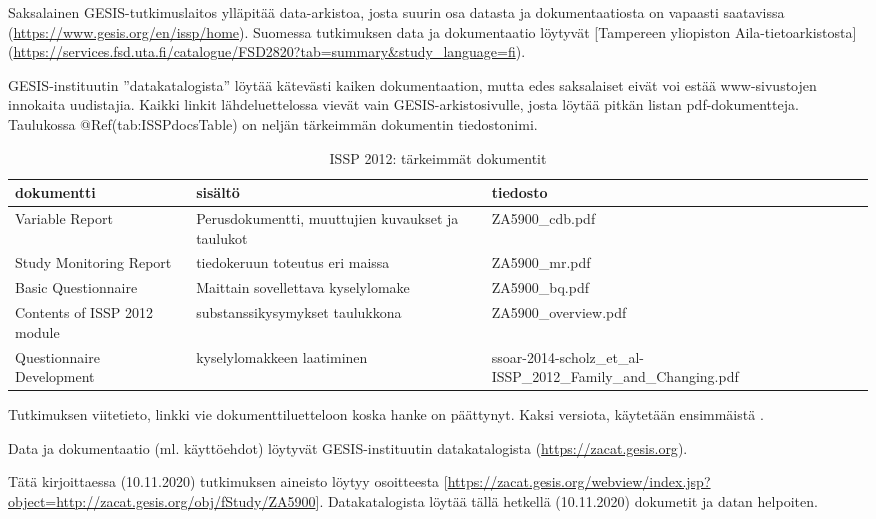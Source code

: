 \documentclass[
  finnish,
]{book}
\begin{document}
Saksalainen GESIS-tutkimuslaitos ylläpitää data-arkistoa, josta suurin osa
datasta ja dokumentaatiosta on vapaasti saatavissa
(\url{https://www.gesis.org/en/issp/home}). Suomessa tutkimuksen data ja dokumentaatio
löytyvät {[}Tampereen yliopiston Aila-tietoarkistosta{]}
(\url{https://services.fsd.uta.fi/catalogue/FSD2820?tab=summary\&study_language=fi}).

GESIS-instituutin ''datakatalogista'' löytää kätevästi kaiken dokumentaation,
mutta edes saksalaiset eivät voi estää www-sivustojen innokaita uudistajia.
Kaikki linkit lähdeluettelossa vievät vain GESIS-arkistosivulle,
josta löytää pitkän listan pdf-dokumentteja. Taulukossa @Ref(tab:ISSPdocsTable)
on neljän tärkeimmän dokumentin tiedostonimi.

\begin{table}

\caption{\label{tab:ISSPdocsTable} ISSP 2012: tärkeimmät dokumentit}
\centering
\begin{tabular}[t]{lll}
\toprule
dokumentti & sisältö & tiedosto\\
\midrule
Variable Report & Perusdokumentti, muuttujien kuvaukset ja taulukot & ZA5900\_cdb.pdf\\
Study Monitoring Report & tiedokeruun toteutus eri maissa & ZA5900\_mr.pdf\\
Basic Questionnaire & Maittain sovellettava kyselylomake & ZA5900\_bq.pdf\\
Contents of ISSP 2012 module & substanssikysymykset taulukkona & ZA5900\_overview.pdf\\
Questionnaire Development & kyselylomakkeen laatiminen & ssoar-2014-scholz\_et\_al-ISSP\_2012\_Family\_and\_Changing.pdf\\
\bottomrule
\end{tabular}
\end{table}

Tutkimuksen viitetieto, linkki vie dokumenttiluetteloon koska hanke on päättynyt.
Kaksi versiota, käytetään ensimmäistä \citep{RefWorks:doc:5b6c7b0de4b0fd36f5bb4c2a} .

Data ja dokumentaatio (ml. käyttöehdot) löytyvät GESIS-instituutin
datakatalogista (\url{https://zacat.gesis.org})\citep{RefWorks:doc:5b6c7f6ce4b0e4e15164ab1a}.

Tätä kirjoittaessa (10.11.2020) tutkimuksen aineisto löytyy osoitteesta
{[}\url{https://zacat.gesis.org/webview/index.jsp?object=http://zacat.gesis.org/obj/fStudy/ZA5900}{]}.
Datakatalogista löytää tällä hetkellä (10.11.2020) dokumetit ja datan helpoiten.
\end{document}
